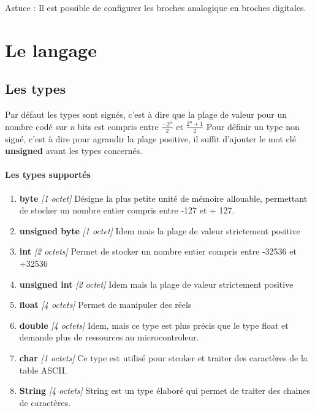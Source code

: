 \documentclass[12pt]{report}
\begin{document}
Astuce : Il est possible de configurer les broches analogique en broches digitales. 


\chapter{Le langage}

\section {Les types}


Par défaut les types sont signés, c'est à dire que la plage de valeur pour un nombre codé sur \emph{n} bits est compris entre $ \frac{-2^n}{2} $ et $ \frac{2^n+1}{2} $ 
Pour définir un type non signé, c'est à dire pour agrandir la plage positive, il suffit d'ajouter le mot clé \textbf{unsigned} avant les types concernés.

\subsubsection {Les types supportés}

\begin{enumerate}
\item \textbf{byte} \textit{[1 octet]} \newline
Désigne la plus petite unité de mémoire allouable, permettant de stocker un nombre entier compris entre -127 et + 127.
\item \textbf{unsigned byte} \textit{[1 octet]} \newline
Idem mais la plage de valeur strictement positive

\item \textbf{int}    \textit{[2 octets]} \newline
Permet de stocker un nombre entier compris entre -32536 et +32536
\item \textbf{unsigned int} \textit{[2 octet]} \newline
Idem mais la plage de valeur strictement positive

\item \textbf{float}  \textit{[4 octets]} \newline
Permet de manipuler des réels
\item \textbf{double} \textit{[4 octets]} \newline
Idem, mais ce type est plus précis que le type float et demande plus de ressources au microcontroleur. 

\item \textbf{char} \textit{[1 octets]} \newline
Ce type est utilisé pour stcoker et traiter des caractères de la table ASCII.
\item \textbf{String} \textit{[4 octets]} \newline
String est un type élaboré qui permet de traiter des chaines de caractères.
\end{enumerate}
\end{document}
